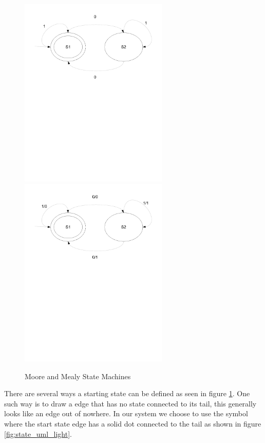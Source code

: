 \begin{figure}[htp]
    \centering
    \includegraphics[trim= 15mm 150mm 15mm 10mm, clip, width=200pt]{./images/state_moore.pdf} 
    \includegraphics[trim= 15mm 150mm 15mm 10mm, clip, width=200pt]{./images/state_mealy.pdf}    
    \caption{Moore and Mealy State Machines}
    \label{fig:state_moore_mealy}
\end{figure}

There are several ways a starting state can be defined as seen in figure \ref{fig:state_moore_mealy}.
One such way is to draw a edge that has no state connected to its tail, this generally looks like an edge out of nowhere. In our system we choose to use the \cite{UML2} symbol where the start state edge has a solid dot connected to the tail as shown in figure \ref{fig:state_uml_light}.

